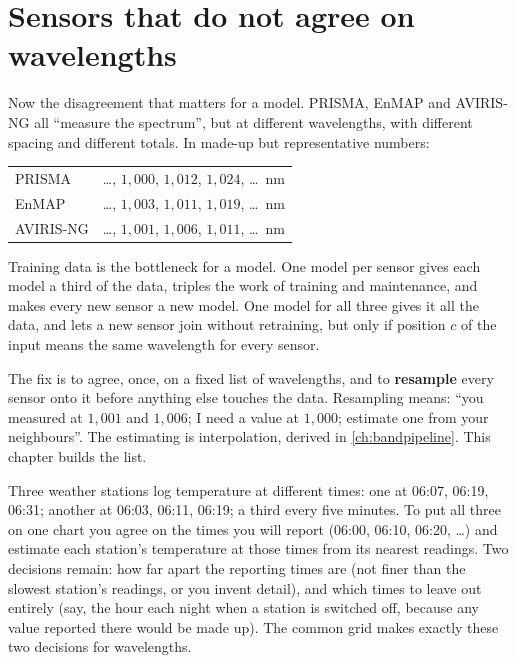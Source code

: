 \section{Sensors that do not agree on wavelengths}\label{sec:sensors:disagree}

Now the disagreement that matters for a model. PRISMA, EnMAP and AVIRIS-NG all ``measure the
spectrum'', but at different wavelengths, with different spacing and different totals. In made-up
but representative numbers\tagA:
\begin{center}
\begin{tabular}{@{}ll@{}}
PRISMA & \dots, $1{,}000$, $1{,}012$, $1{,}024$, \dots\ nm\\
EnMAP & \dots, $1{,}003$, $1{,}011$, $1{,}019$, \dots\ nm\\
AVIRIS-NG & \dots, $1{,}001$, $1{,}006$, $1{,}011$, \dots\ nm
\end{tabular}
\end{center}
Training data is the bottleneck for a model. One model per sensor gives each model a third of the
data, triples the work of training and maintenance, and makes every new sensor a new model. One
model for all three gives it all the data, and lets a new sensor join without retraining, but only
if position $c$ of the input means the same wavelength for every sensor.

The fix is to agree, once, on a fixed list of wavelengths, and to \textbf{resample}%
 every sensor onto it before anything else touches the data. Resampling means:
``you measured at $1{,}001$ and $1{,}006$; I need a value at $1{,}000$; estimate one from your
neighbours''. The estimating is interpolation, derived in \cref{ch:bandpipeline}. This chapter
builds the list.

\begin{analogy}
Three weather stations log temperature at different times: one at 06:07, 06:19, 06:31; another at
06:03, 06:11, 06:19; a third every five minutes. To put all three on one chart you agree on the
times you will report (06:00, 06:10, 06:20, \dots) and estimate each station's temperature at
those times from its nearest readings. Two decisions remain: how far apart the reporting times
are (not finer than the slowest station's readings, or you invent detail), and which times to
leave out entirely (say, the hour each night when a station is switched off, because any value
reported there would be made up). The common grid makes exactly these two decisions for
wavelengths.
\end{analogy}


